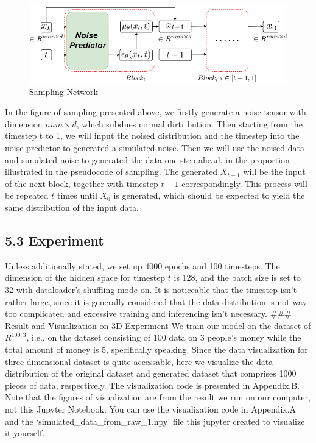 \documentclass[11pt]{article}
\begin{document}
\begin{figure}
    \centering
    \begin{minipage}{0.8\textwidth}
        \includegraphics[width=\textwidth]{image/sampling.png}
        \caption{Sampling Network}
    \end{minipage}
\end{figure}

In the figure of sampling presented above, we firstly generate a noise tensor with
dimension \(num \times d\), which subdues normal dirtribution. Then
starting from the timestep t to 1, we will input the noised distribution
and the timestep into the noise predictor to generated a simulated
noise. Then we will use the noised data and simulated noise to generated
the data one step ahead, in the proportion illustrated in the pseudocode
of sampling. The generated \(X_{t-1}\) will be the input of the next
block, together with timestep \(t-1\) correspondingly. This process will
be repeated \(t\) times until \(X_0\) is generated, which should be
expected to yield the same distribution of the input data.

    \subsection*{5.3 Experiment}\label{experiment}

Unless additionally stated, we set up 4000 epochs and 100 timesteps. The
dimension of the hidden space for timestep \(t\) is 128, and the batch
size is set to 32 with dataloader's shuffling mode on. It is noticeable
that the timestep isn't rather large, since it is generally considered
that the data distribution is not way too complicated and excessive
training and inferencing isn't necessary. \#\#\# Result and
Visualization on 3D Experiment We train our model on the dataset of
\(R^{100, 3}\), i.e., on the dataset consisting of 100 data on 3
people's money while the total amount of money is 5, specifically
speaking. Since the data visualization for three dimensional dataset is
quite accessable, here we visualize the data distribution of the
original dataset and generated dataset that comprises 1000 pieces of
data, respectively. The visualization code is presented in Appendix.B.
Note that the figures of visualization are from the result we run on our
computer, not this Jupyter Notebook. You can use the visualization code
in Appendix.A and the `simulated\_data\_from\_raw\_1.npy' file this
jupyter created to visualize it yourself.
\end{document}
